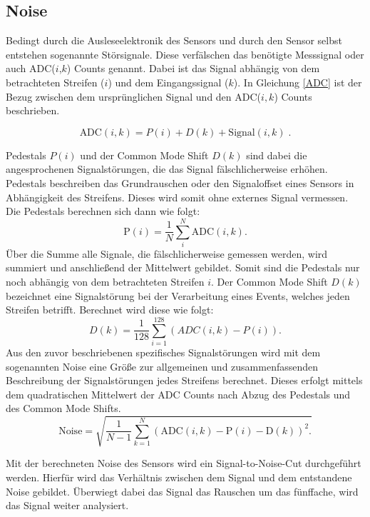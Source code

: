 \subsection{Noise}
\label{noise}
Bedingt durch die Ausleseelektronik des Sensors und durch den Sensor selbst entstehen sogenannte Störsignale. Diese verfälschen das benötigte Messsignal oder auch ADC($i$,$k$) Counts genannt. Dabei ist das Signal abhängig von dem betrachteten Streifen ($i$) und dem Eingangssignal ($k$). In Gleichung \ref{ADC} ist der Bezug zwischen dem ursprünglichen Signal und den ADC($i,k$) Counts beschrieben.

\begin{equation}
\label{ADC}
\text{ADC}(i,k)=P(i)+D(k)+\text{Signal}(i,k)\;.
\end{equation}

Pedestals $P(i)$ und der Common Mode Shift $D(k)$ sind dabei die angesprochenen Signalstörungen, die das Signal fälschlicherweise erhöhen. Pedestals beschreiben das Grundrauschen oder den Signaloffset eines Sensors in Abhängigkeit des Streifens. Dieses wird somit ohne externes Signal vermessen. Die Pedestals berechnen sich dann wie folgt:
\begin{equation}
    \label{peds}
    \text{P}(i)=\frac{1}{N}\sum_i^{N} \text{ADC}(i,k).
\end{equation}
Über die Summe alle Signale, die fälschlicherweise gemessen werden, wird summiert und anschließend der Mittelwert gebildet. Somit sind die Pedestals nur noch abhängig von dem betrachteten Streifen $i$. Der Common Mode Shift $D(k)$ bezeichnet eine Signalstörung bei der Verarbeitung eines Events, welches jeden Streifen betrifft. Berechnet wird diese wie folgt:
\begin{equation}
    \label{common}
    D(k)=\frac{1}{128}\sum_{i=1}^{128}(ADC(i,k)-P(i)).
\end{equation}
Aus den zuvor beschriebenen spezifisches Signalstörungen wird mit dem sogenannten Noise eine Größe zur allgemeinen und zusammenfassenden Beschreibung der Signalstörungen jedes Streifens berechnet. Dieses erfolgt mittels dem quadratischen Mittelwert der ADC Counts nach Abzug des Pedestals und des Common Mode Shifts.
\begin{equation}
    \label{noise}
    \text{Noise}=\sqrt{\frac{1}{N-1}\sum_{k=1}^{N}( \text{ADC}(i,k)-\text{P}(i)-\text{D}(k))^2. }
\end{equation}

Mit der berechneten Noise des Sensors wird ein Signal-to-Noise-Cut durchgeführt werden. Hierfür wird das Verhältnis zwischen dem Signal und dem entstandene Noise gebildet. Überwiegt dabei das Signal das Rauschen um das fünffache, wird das Signal weiter analysiert. 

